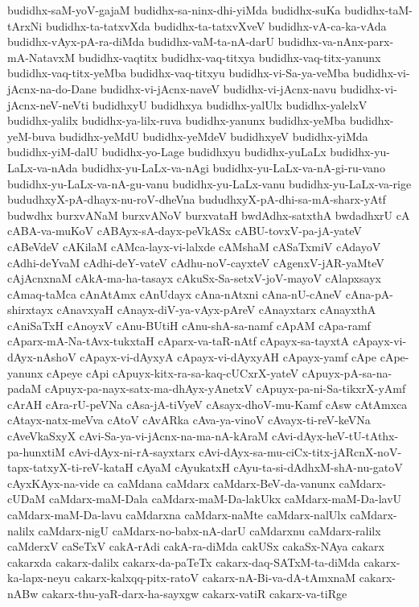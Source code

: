 {budidhx-saM-yoV-gajaM
budidhx-sa-ninx-dhi-yiMda
budidhx-suKa
budidhx-taM-tArxNi
budidhx-ta-tatxvXda
budidhx-ta-tatxvXveV
budidhx-vA-ca-ka-vAda
budidhx-vAyx-pA-ra-diMda
budidhx-vaM-ta-nA-darU
budidhx-va-nAnx-parx-mA-NatavxM
budidhx-vaqtitx
budidhx-vaq-titxya
budidhx-vaq-titx-yanunx
budidhx-vaq-titx-yeMba
budidhx-vaq-titxyu
budidhx-vi-Sa-ya-veMba
budidhx-vi-jAcnx-na-do-Dane
budidhx-vi-jAcnx-naveV
budidhx-vi-jAcnx-navu
budidhx-vi-jAcnx-neV-neVti
budidhxyU
budidhxya
budidhx-yalUlx
budidhx-yalelxV
budidhx-yalilx
budidhx-ya-lilx-ruva
budidhx-yanunx
budidhx-yeMba
budidhx-yeM-buva
budidhx-yeMdU
budidhx-yeMdeV
budidhxyeV
budidhx-yiMda
budidhx-yiM-dalU
budidhx-yo-Lage
budidhxyu
budidhx-yuLaLx
budidhx-yu-LaLx-va-nAda
budidhx-yu-LaLx-va-nAgi
budidhx-yu-LaLx-va-nA-gi-ru-vano
budidhx-yu-LaLx-va-nA-gu-vanu
budidhx-yu-LaLx-vanu
budidhx-yu-LaLx-va-rige
bududhxyX-pA-dhayx-nu-roV-dheVna
bududhxyX-pA-dhi-sa-mA-sharx-yAtf
budwdhx
burxvANaM
burxvANoV
burxvataH
bwdAdhx-satxthA
bwdadhxrU
cA
cABA-va-muKoV
cABAyx-sA-dayx-peVkASx
cABU-tovxV-pa-jA-yateV
cABeVdeV
cAKilaM
cAMca-layx-vi-lalxde
cAMshaM
cASaTxmiV
cAdayoV
cAdhi-deYvaM
cAdhi-deY-vateV
cAdhu-noV-cayxteV
cAgenxV-jAR-yaMteV
cAjAcnxnaM
cAkA-ma-ha-tasayx
cAkuSx-Sa-setxV-joV-mayoV
cAlapxsayx
cAmaq-taMca
cAnAtAmx
cAnUdayx
cAna-nAtxni
cAna-nU-cAneV
cAna-pA-shirxtayx
cAnavxyaH
cAnayx-diV-ya-vAyx-pAreV
cAnayxtarx
cAnayxthA
cAniSaTxH
cAnoyxV
cAnu-BUtiH
cAnu-shA-sa-namf
cApAM
cApa-ramf
cAparx-mA-Na-tAvx-tukxtaH
cAparx-va-taR-nAtf
cApayx-sa-tayxtA
cApayx-vi-dAyx-nAshoV
cApayx-vi-dAyxyA
cApayx-vi-dAyxyAH
cApayx-yamf
cApe
cApe-yanunx
cApeye
cApi
cApuyx-kitx-ra-sa-kaq-cUCxrX-yateV
cApuyx-pA-sa-na-padaM
cApuyx-pa-nayx-satx-ma-dhAyx-yAnetxV
cApuyx-pa-ni-Sa-tikxrX-yAmf
cArAH
cAra-rU-peVNa
cAsa-jA-tiVyeV
cAsayx-dhoV-mu-Kamf
cAsw
cAtAmxca
cAtayx-natx-meVva
cAtoV
cAvARka
cAva-ya-vinoV
cAvayx-ti-reV-keVNa
cAveVkaSxyX
cAvi-Sa-ya-vi-jAcnx-na-ma-nA-kAraM
cAvi-dAyx-heV-tU-tAthx-pa-hunxtiM
cAvi-dAyx-ni-rA-sayxtarx
cAvi-dAyx-sa-mu-ciCx-titx-jARcnX-noV-tapx-tatxyX-ti-reV-kataH
cAyaM
cAyukatxH
cAyu-ta-si-dAdhxM-shA-nu-gatoV
cAyxKAyx-na-vide
ca
caMdana
caMdarx
caMdarx-BeV-da-vanunx
caMdarx-cUDaM
caMdarx-maM-Dala
caMdarx-maM-Da-lakUkx
caMdarx-maM-Da-lavU
caMdarx-maM-Da-lavu
caMdarxna
caMdarx-naMte
caMdarx-nalUlx
caMdarx-nalilx
caMdarx-nigU
caMdarx-no-babx-nA-darU
caMdarxnu
caMdarx-ralilx
caMderxV
caSeTxV
cakA-rAdi
cakA-ra-diMda
cakUSx
cakaSx-NAya
cakarx
cakarxda
cakarx-dalilx
cakarx-da-paTeTx
cakarx-daq-SATxM-ta-diMda
cakarx-ka-lapx-neyu
cakarx-kalxqq-pitx-ratoV
cakarx-nA-Bi-va-dA-tAmxnaM
cakarx-nABw
cakarx-thu-yaR-darx-ha-sayxgw
cakarx-vatiR
cakarx-va-tiRge
}
